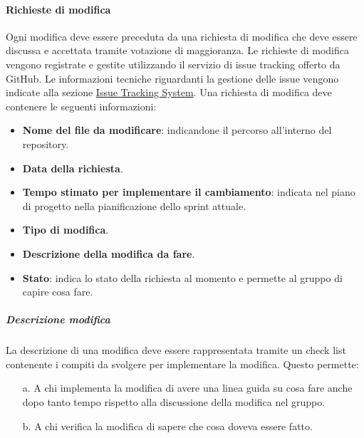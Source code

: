 \paragraph{Richieste di modifica}
Ogni modifica deve essere preceduta da una richiesta di modifica che deve essere discussa e accettata tramite votazione di maggioranza.
Le richieste di modifica vengono registrate e gestite utilizzando il servizio di issue tracking offerto da GitHub.  
Le informazioni tecniche riguardanti la gestione delle issue vengono indicate alla sezione \hyperref[subpar:ITS]{Issue Tracking System}.
Una richiesta di modifica deve contenere le seguenti informazioni:
\begin{itemize}
    \item \textbf{Nome del file da modificare}: indicandone il percorso all'interno del repository.
    \item \textbf{Data della richiesta}.
    \item \textbf{Tempo stimato per implementare il cambiamento}: indicata nel piano di progetto nella pianificazione dello sprint attuale.
    \item \textbf{Tipo di modifica}.
    \item \textbf{Descrizione della modifica da fare}.
    \item \textbf{Stato}: indica lo stato della richiesta al momento e permette al gruppo di capire cosa fare.
\end{itemize}

\subparagraph{Descrizione modifica}
La descrizione di una modifica deve essere rappresentata tramite un check list contenente i compiti da svolgere per implementare la modifica.
Questo permette:
\begin{enumerate}
    \item [a.] A chi implementa la modifica di avere una linea guida su cosa fare anche dopo tanto tempo rispetto alla discussione della modifica nel gruppo.
    \item [b.] A chi verifica la modifica di sapere che cosa doveva essere fatto.
\end{enumerate} 

